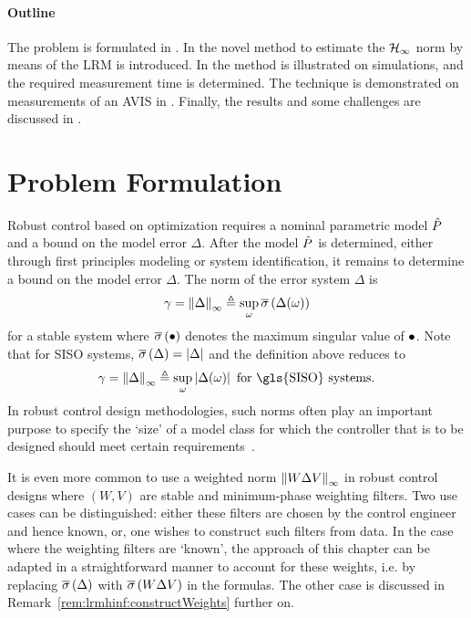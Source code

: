 \paragraph*{Outline}
\label{par:lrmhinf:toc}
The problem is formulated in .
In  the novel method to estimate the $\mathcal{H}_{\infty}{}$ norm by means of the \gls{LRM} is introduced.
In  the method is illustrated on simulations, and the required measurement time is determined.
The technique is demonstrated on measurements of an \gls{AVIS} in .
Finally, the results and some challenges are discussed in .


\section{Problem Formulation}
\label{sec:lrmhinf:Problem}
Robust control based on \Hinf{} optimization requires a nominal parametric model $\hat{P}$ and a bound on the model error $\Delta$. 
After the model $\hat{P}$ is determined, either through first principles modeling or system identification, it remains to determine a bound on the model error $\Delta$.
The \Hinf{} norm of the error system $\Delta$ is
\begin{equation}
  \gamma 
     = 
       \left\| \Delta \right\|_{\infty} 
    \triangleq 
       \sup_{\omega} 
          \overline{\sigma} \left( \Delta(\omega) \right) 
  \label{eq:lrmhinf:HinfNorm}
\end{equation}
for a stable system where $ \overline{\sigma} \left( \bullet \right) $ denotes the maximum singular value of $\bullet$.
Note that for \gls{SISO} systems, $ \overline{\sigma} \left( \Delta \right)  = \left| \Delta \right|$ and the definition above reduces to
\begin{equation}
  \gamma 
    = 
       \infnorm{\Delta} 
    \isdef 
         \sup_{\omega} 
         \abs{\Delta(\omega)}
  \text{ for \gls{SISO} systems}
  \text{.}
  \label{eq:lrmhinf:HinfNormSISO}
\end{equation}
In robust control design methodologies, such \Hinf{} norms often play an important purpose to specify the `size' of a model class for which the controller that is to be designed should meet certain requirements~\citep{Skogestad2005}.

\begin{remark}
It is even more common to use a weighted norm $\left\| W \Delta V \right\|_{\infty}$ in robust control designs where $(W,V)$ are stable and minimum-phase weighting filters.
Two use cases can be distinguished: either these filters are chosen by the control engineer and hence known, or, one wishes to construct such filters from data.
In the case where the weighting filters are `known', the approach of this chapter can be adapted in a straightforward manner to account for these weights, i.e. by replacing $ \overline{\sigma} \left( \Delta \right) $ with $ \overline{\sigma} \left( W \Delta V \right) $ in the formulas.
The other case is discussed in Remark~\ref{rem:lrmhinf:constructWeights} further on.
\end{remark}

